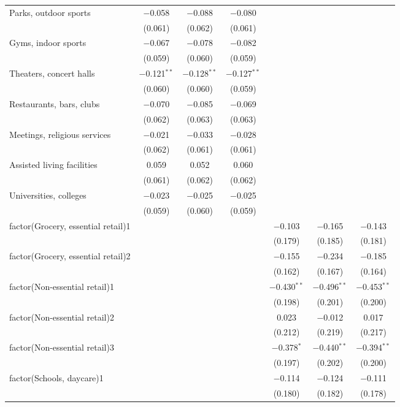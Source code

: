 \begin{table}[!htbp]
\begin{tabular}{@{\extracolsep{5pt}}lcccccc}
  Parks, outdoor sports & $-$0.058 & $-$0.088 & $-$0.080 &  &  &  \\ 
  & (0.061) & (0.062) & (0.061) &  &  &  \\ 
  Gyms, indoor sports & $-$0.067 & $-$0.078 & $-$0.082 &  &  &  \\ 
  & (0.059) & (0.060) & (0.059) &  &  &  \\ 
  Theaters, concert halls & $-$0.121$^{**}$ & $-$0.128$^{**}$ & $-$0.127$^{**}$ &  &  &  \\ 
  & (0.060) & (0.060) & (0.059) &  &  &  \\ 
  Restaurants, bars, clubs & $-$0.070 & $-$0.085 & $-$0.069 &  &  &  \\ 
  & (0.062) & (0.063) & (0.063) &  &  &  \\ 
  Meetings, religious services & $-$0.021 & $-$0.033 & $-$0.028 &  &  &  \\ 
  & (0.062) & (0.061) & (0.061) &  &  &  \\ 
  Assisted living facilities & 0.059 & 0.052 & 0.060 &  &  &  \\ 
  & (0.061) & (0.062) & (0.062) &  &  &  \\ 
  Universities, colleges & $-$0.023 & $-$0.025 & $-$0.025 &  &  &  \\ 
  & (0.059) & (0.060) & (0.059) &  &  &  \\ 
  factor(Grocery, essential retail)1 &  &  &  & $-$0.103 & $-$0.165 & $-$0.143 \\ 
  &  &  &  & (0.179) & (0.185) & (0.181) \\ 
  factor(Grocery, essential retail)2 &  &  &  & $-$0.155 & $-$0.234 & $-$0.185 \\ 
  &  &  &  & (0.162) & (0.167) & (0.164) \\ 
  factor(Non-essential retail)1 &  &  &  & $-$0.430$^{**}$ & $-$0.496$^{**}$ & $-$0.453$^{**}$ \\ 
  &  &  &  & (0.198) & (0.201) & (0.200) \\ 
  factor(Non-essential retail)2 &  &  &  & 0.023 & $-$0.012 & 0.017 \\ 
  &  &  &  & (0.212) & (0.219) & (0.217) \\ 
  factor(Non-essential retail)3 &  &  &  & $-$0.378$^{*}$ & $-$0.440$^{**}$ & $-$0.394$^{**}$ \\ 
  &  &  &  & (0.197) & (0.202) & (0.200) \\ 
  factor(Schools, daycare)1 &  &  &  & $-$0.114 & $-$0.124 & $-$0.111 \\ 
  &  &  &  & (0.180) & (0.182) & (0.178) \\ 

\end{tabular}
\end{table}
